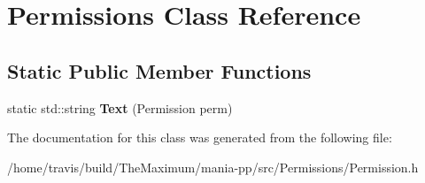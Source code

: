 \hypertarget{classPermissions}{\section{Permissions Class Reference}
\label{classPermissions}
}
\subsection*{Static Public Member Functions}
\begin{DoxyCompactItemize}
\item 
\hypertarget{classPermissions_ab414bcf40bccee64148f085a5f29b42e}{static std\-::string {\bfseries Text} (Permission perm)}\label{classPermissions_ab414bcf40bccee64148f085a5f29b42e}

\end{DoxyCompactItemize}


The documentation for this class was generated from the following file\-:\begin{DoxyCompactItemize}
\item 
/home/travis/build/\-The\-Maximum/mania-\/pp/src/\-Permissions/Permission.\-h\end{DoxyCompactItemize}
